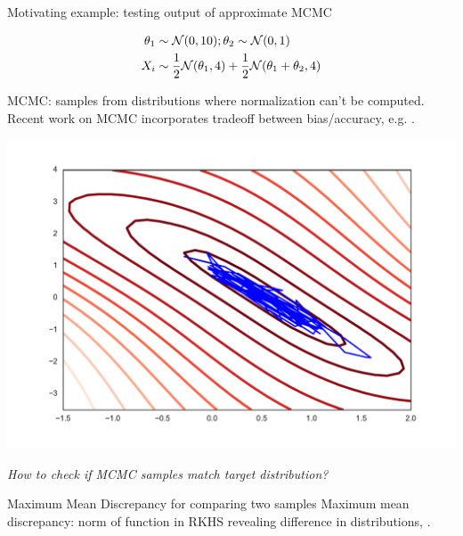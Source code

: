 

\begin{frame}
\begin{columns}
\begin{column}{.33\linewidth}
\begin{block}{Motivating example: testing output of approximate MCMC}
\begin{minipage}{.49\linewidth}

\begin{align*}
 \theta_{1}&\sim{\cal N}(0,10);\theta_{2}\sim{\cal N}(0,1) \\
 X_{i} &\sim\frac{1}{2}{\cal N}(\theta_{1},4)+\frac{1}{2}{\cal N}(\theta_{1}+\theta_{2},4)
\end{align*}
 \vspace{1cm} 


MCMC: samples from distributions where normalization can't be computed.
Recent work on MCMC  incorporates tradeoff between bias/accuracy, e.g. \cite{korattikara2013austerity}.
\end{minipage}
\begin{minipage}{.4\linewidth}
\includegraphics[scale=0.65]{../../presentation/img/sgld_trace_and_density.pdf}
\end{minipage}
\vspace{1cm}
\begin{center}
{\large\emph{How to check if MCMC samples match target distribution?}}
\end{center}
\end{block}
\vspace{-0.75cm}
\begin{block}{Maximum Mean Discrepancy for comparing two samples}
Maximum mean discrepancy: norm of function in RKHS revealing difference in distributions, \cite{gretton2012kernel}.


\end{block}
\end{column}
\end{columns}
\end{frame}
